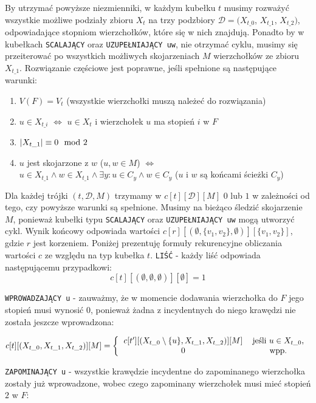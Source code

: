 \documentclass[12pt, oneside]{report}
\begin{document}
By utrzymać powyższe niezmienniki, w każdym kubełku $t$ musimy rozważyć wszystkie możliwe podziały zbioru $X_t$ na trzy podzbiory $\mathcal{D} = (X_{t\_0}$, $X_{t\_1}$, $X_{t\_2})$, odpowiadające stopniom wierzchołków, które się w nich znajdują. Ponadto by w kubełkach \texttt{SCALAJĄCY} oraz \texttt{UZUPEŁNIAJĄCY uw}, nie otrzymać cyklu, musimy się przeiterować po wszystkich możliwych skojarzeniach $M$ wierzchołków ze zbioru $X_{t\_1}$. Rozwiązanie częściowe jest poprawne, jeśli spełnione są następujące warunki:
\begin{enumerate}
\item $V(F) = V_t$ (wszystkie wierzchołki muszą należeć do rozwiązania)
\item $u \in X_{t\_i}$ $\Leftrightarrow$ $u \in X_t$ i wierzchołek $u$ ma stopień $i$ w $F$
\item $\abs{X_{t\_1}} \equiv 0 \mod 2$
\item $u$ jest skojarzone z $w$ (${u, w} \in M$) $\Leftrightarrow$ $u \in X_{t\_1} \wedge w \in X_{t\_1} \wedge \exists y: u \in C_y \wedge w \in C_y$ ($u$ i $w$ są końcami ścieżki $C_y$) 
\end{enumerate}  

Dla każdej trójki $(t, \mathcal{D}, M)$ trzymamy w $c[t][\mathcal{D}][M]$ $0$ lub $1$ w zależności od tego, czy powyższe warunki są spełnione. Musimy na bieżąco śledzić skojarzenie $M$, ponieważ kubełki typu \texttt{SCALAJĄCY} oraz \texttt{UZUPEŁNIAJĄCY uw} mogą utworzyć cykl. Wynik końcowy odpowiada wartości $c[r][(\emptyset, \{v_1, v_2\}, \emptyset)][\{v_1, v_2\}]$, gdzie $r$ jest korzeniem. Poniżej prezentuję formuły rekurencyjne obliczania wartości $c$ ze względu na typ kubełka $t$.
\newline\newline
\texttt{LIŚĆ} - każdy liść odpowiada następującemu przypadkowi:
$$c[t][(\emptyset, \emptyset, \emptyset)][\emptyset] = 1$$

\texttt{WPROWADZAJĄCY u} - zauważmy, że w momencie dodawania wierzchołka do $F$ jego stopień musi wynosić $0$, ponieważ żadna z incydentnych do niego krawędzi nie została jeszcze wprowadzona:

\[
c[t][(X_{t\_0}, X_{t\_1}, X_{t\_2})][M] =  
\left \{
  \begin{tabular}{ccc}
  $c[t^{\prime}][(X_{t\_0} \setminus \{u\}, X_{t\_1}, X_{t\_2})][M]$ & jeśli $u \in X_{t\_0}$,\\
  $0$ & wpp.
  \end{tabular}
\right. 
\]

\texttt{ZAPOMINAJĄCY u} - wszystkie krawędzie incydentne do zapominanego wierzchołka zostały już wprowadzone, wobec czego zapominany wierzchołek musi mieć stopień $2$ w $F$:
\end{document}
